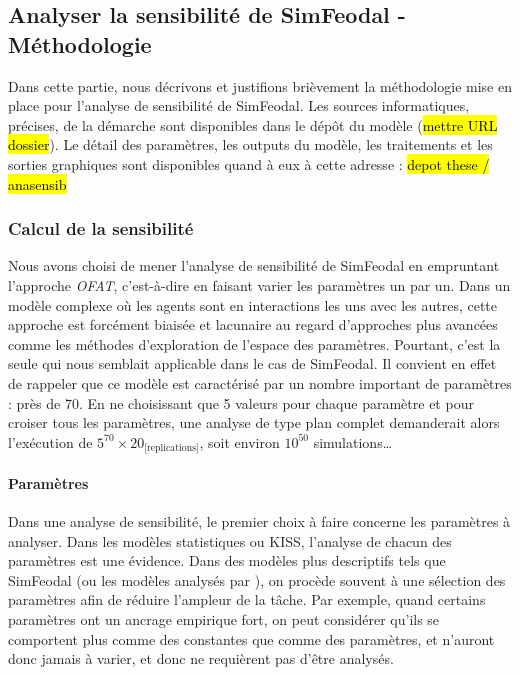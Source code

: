 \subsection{Analyser la sensibilité de SimFeodal - Méthodologie}

Dans cette partie, nous décrivons et justifions brièvement la méthodologie mise en place pour l'analyse de sensibilité de SimFeodal.
Les sources informatiques, précises, de la démarche sont disponibles dans le dépôt du modèle (\hl{mettre URL dossier}).
Le détail des paramètres, les outputs du modèle, les traitements et les sorties graphiques sont disponibles quand à eux à cette adresse : \hl{depot these / anasensib}

%


\subsubsection{Calcul de la sensibilité}

Nous avons choisi de mener l'analyse de sensibilité de SimFeodal en empruntant l'approche \textit{OFAT}, c'est-à-dire en faisant varier les paramètres un par un.
Dans un modèle complexe où les agents sont en interactions les uns avec les autres, cette approche est forcément biaisée et lacunaire au regard d'approches plus avancées comme les méthodes d'exploration de l'espace des paramètres.
Pourtant, c'est la seule qui nous semblait applicable dans le cas de SimFeodal.
Il convient en effet de rappeler que ce modèle est caractérisé par un nombre important de paramètres : près de 70.
En ne choisissant que 5 valeurs pour chaque paramètre et pour croiser tous les paramètres, une analyse de type plan complet demanderait alors l'exécution de $5^{70} \times 20_{\text{[replications]}}$, soit environ $10^{50}$ simulations\ldots

\paragraph{Paramètres}

Dans une analyse de sensibilité, le premier choix à faire concerne les paramètres à analyser.
Dans les modèles statistiques ou KISS, l'analyse de chacun des paramètres est une évidence.
Dans des modèles plus descriptifs tels que SimFeodal (ou les modèles analysés par \textcite{hirtzel2015exploration}), on procède souvent à une sélection des paramètres afin de réduire l'ampleur de la tâche.
Par exemple, quand certains paramètres ont un ancrage empirique fort, on peut considérer qu'ils se comportent plus comme des constantes que comme des paramètres, et n'auront donc jamais à varier, et donc ne requièrent pas d'être analysés.

